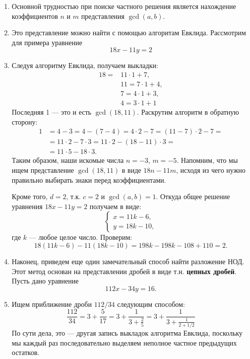 \begin{enumerate}

\item Основной трудностью при поиске частного решения является нахождение коэффициентов $n$ и $m$ представления $\gcd(a,b)$.
\item Это представление можно найти с помощью алгоритам Евклида. Рассмотрим для примера уравнение
$$
18x-11y=2
$$
\item Следуя алгоритму Евклида, получаем выкладки:
\begin{align*}
18 = & 11\cdot 1+7,\\
   & 11 = 7\cdot 1 + 4, \\
   & 7 = 4\cdot 1 + 3, \\
   & 4 = 3\cdot 1 + 1
\end{align*}
Последняя 1 --- это и есть $\gcd(18,11)$. Раскрутим алгоритм в обратную сторону:
\begin{align*}
1 & = 4-3 = 4 - (7-4) = 4\cdot 2-7 = (11-7)\cdot 2-7 =\\
  & = 11\cdot 2-7\cdot 3 = 11\cdot 2 - (18-11)\cdot 3 =\\
  & = 11\cdot 5 - 18\cdot 3.
\end{align*}
Таким образом, наши искомые числа $n=-3$, $m=-5$. Напомним, что мы ищем представление $\gcd(18,11)$ в виде $18n-11m$, исходя из чего нужно правильно выбирать знаки перед коэффициентами.

Кроме того, $d=2$, т.к. $c=2$ и $\gcd(a,b)=1$. Откуда общее решение уравнения $18x-11y=2$ получаем в виде:
$$
\begin{cases}
x  =11k - 6, \\
y  =18k - 10,
\end{cases}
$$
где $k$ --- любое целое число. Проверим:
$$
18(11k - 6) - 11(18k - 10) = 198k-198k - 108 + 110 =2.
$$
\item Наконец, приведем еще один замечательный способ найти разложение НОД. Этот метод основан на представлении дробей в виде т.н. \textbf{цепных дробей}. Пусть дано уравнение
$$
112x-34y=16.
$$
\item Ищем приближение дроби $112/34$ следующим способом:
$$
\frac{112}{34} = 3 + \frac{5}{17} = 3 + \frac{1}{3+\frac{2}{5}} = 
3 + \frac{1}{3 + \frac{1}{2+1/2}}
$$
По сути дела, это --- другая запись выкладок алгоритма Евклида, поскольку мы каждый раз последовательно выделяем неполное частное предыдущих остатков.


\end{enumerate}
